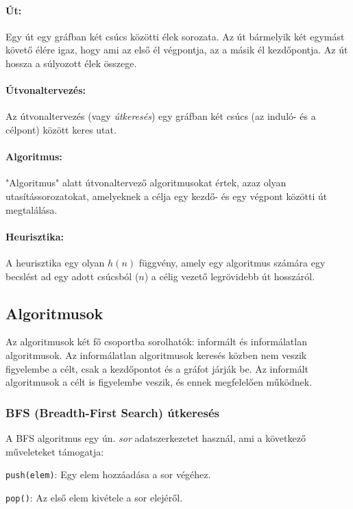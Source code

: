 \paragraph{Út:} Egy út egy gráfban két csúcs közötti élek sorozata. Az út bármelyik két egymást követő élére igaz, hogy ami az első él végpontja, az a másik él kezdőpontja. Az út hossza a súlyozott élek összege.

\paragraph{Útvonaltervezés:} Az útvonaltervezés (vagy \textit{útkeresés}) egy gráfban két csúcs (az induló- és a célpont) között keres utat.

\paragraph{Algoritmus:} "Algoritmus" alatt útvonaltervező algoritmusokat értek, azaz olyan utasítássorozatokat, amelyeknek a célja egy kezdő- és egy végpont közötti út megtalálása.

\paragraph{Heurisztika:} A heurisztika egy olyan $h(n)$ függvény, amely egy algoritmus számára egy becslést ad egy adott csúcsból ($n$) a célig vezető legrövidebb út hosszáról\cite{russell2020artificial}.

\subsection{Algoritmusok}
\label{ch:algo}

Az algoritmusok két fő csoportba sorolhatók: informált és informálatlan algoritmusok\cite{russell2020artificial}. Az informálatlan algoritmusok keresés közben nem veszik figyelembe a célt, csak a kezdőpontot és a gráfot járják be. Az informált algoritmusok a célt is figyelembe veszik, és ennek megfelelően működnek.

\subsubsection{BFS (Breadth-First Search) útkeresés}

A BFS algoritmus egy ún. \textit{sor} adatszerkezetet használ\cite{russell2020artificial}, ami a következő műveleteket támogatja:

\begin{compactitem}
    \item \texttt{push(elem)}: Egy elem hozzáadása a sor végéhez.
    \item \texttt{pop()}: Az első elem kivétele a sor elejéről.
\end{compactitem}

